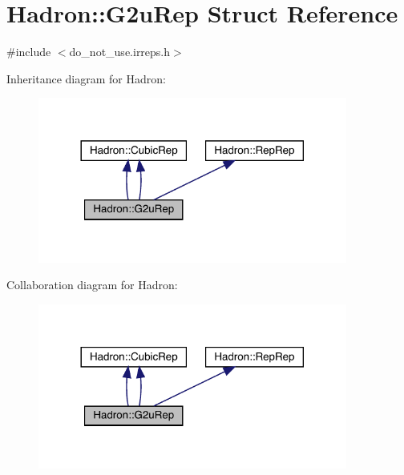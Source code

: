 \hypertarget{structHadron_1_1G2uRep}{}\section{Hadron\+:\+:G2u\+Rep Struct Reference}
\label{structHadron_1_1G2uRep}


{\ttfamily \#include $<$do\+\_\+not\+\_\+use.\+irreps.\+h$>$}



Inheritance diagram for Hadron\+:\nopagebreak
\begin{figure}[H]
\begin{center}
\leavevmode
\includegraphics[width=288pt]{df/d1f/structHadron_1_1G2uRep__inherit__graph}
\end{center}
\end{figure}


Collaboration diagram for Hadron\+:\nopagebreak
\begin{figure}[H]
\begin{center}
\leavevmode
\includegraphics[width=288pt]{d4/dd6/structHadron_1_1G2uRep__coll__graph}
\end{center}
\end{figure}
